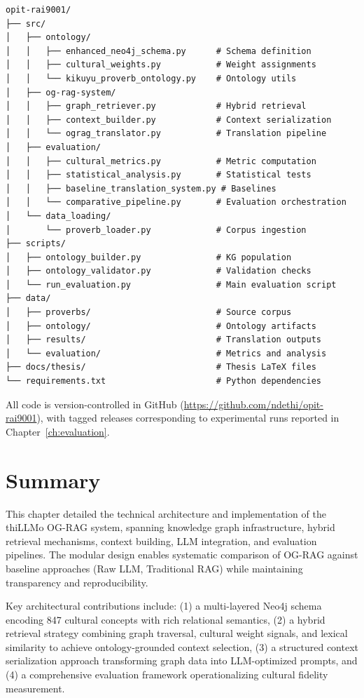 \begin{verbatim}
opit-rai9001/
├── src/
│   ├── ontology/
│   │   ├── enhanced_neo4j_schema.py      # Schema definition
│   │   ├── cultural_weights.py           # Weight assignments
│   │   └── kikuyu_proverb_ontology.py    # Ontology utils
│   ├── og-rag-system/
│   │   ├── graph_retriever.py            # Hybrid retrieval
│   │   ├── context_builder.py            # Context serialization
│   │   └── ograg_translator.py           # Translation pipeline
│   ├── evaluation/
│   │   ├── cultural_metrics.py           # Metric computation
│   │   ├── statistical_analysis.py       # Statistical tests
│   │   ├── baseline_translation_system.py # Baselines
│   │   └── comparative_pipeline.py       # Evaluation orchestration
│   └── data_loading/
│       └── proverb_loader.py             # Corpus ingestion
├── scripts/
│   ├── ontology_builder.py               # KG population
│   ├── ontology_validator.py             # Validation checks
│   └── run_evaluation.py                 # Main evaluation script
├── data/
│   ├── proverbs/                         # Source corpus
│   ├── ontology/                         # Ontology artifacts
│   ├── results/                          # Translation outputs
│   └── evaluation/                       # Metrics and analysis
├── docs/thesis/                          # Thesis LaTeX files
└── requirements.txt                      # Python dependencies
\end{verbatim}

All code is version-controlled in GitHub (\url{https://github.com/ndethi/opit-rai9001}), with tagged releases corresponding to experimental runs reported in Chapter~\ref{ch:evaluation}.

\section{Summary}
\label{sec:design_summary}

This chapter detailed the technical architecture and implementation of the thiLLMo OG-RAG system, spanning knowledge graph infrastructure, hybrid retrieval mechanisms, context building, LLM integration, and evaluation pipelines. The modular design enables systematic comparison of OG-RAG against baseline approaches (Raw LLM, Traditional RAG) while maintaining transparency and reproducibility.

Key architectural contributions include: (1) a multi-layered Neo4j schema encoding 847 cultural concepts with rich relational semantics, (2) a hybrid retrieval strategy combining graph traversal, cultural weight signals, and lexical similarity to achieve ontology-grounded context selection, (3) a structured context serialization approach transforming graph data into LLM-optimized prompts, and (4) a comprehensive evaluation framework operationalizing cultural fidelity measurement.

